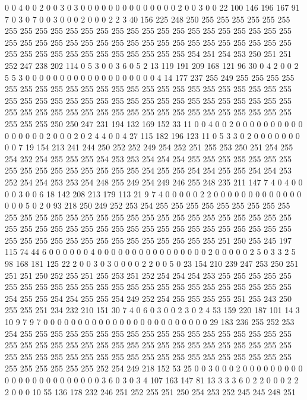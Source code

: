 0 0 4 0 0 2 0 0 3 0 3 0 0 0 0 0 0 0 0 0
0 0 0 0 0 2 0 0 3 0 0 22 100 146 196 167 91 7 0 3
0 7 0 0 3 0 0 0 2 0 0 0 2 2 3 40 156 225 248 250
255 255 255 255 255 255 255 255 255 255 255 255 255 255 255 255 255 255 255 255
255 255 255 255 255 255 255 255 255 255 255 255 255 255 255 255 255 255 255 255
255 255 255 255 255 255 255 255 255 255 255 255 255 255 255 255 254 251 254 253
250 251 251 252 247 238 202 114 0 5 3 0 0 3 6 0 5 2 13 119
191 209 168 121 96 30 0 4 2 0 0 2 5 5 3 0 0 0 0 0
0 0 0 0 0 0 0 0 0 0 0 0 0 0 4 14 177 237 255 249
255 255 255 255 255 255 255 255 255 255 255 255 255 255 255 255 255 255 255 255
255 255 255 255 255 255 255 255 255 255 255 255 255 255 255 255 255 255 255 255
255 255 255 255 255 255 255 255 255 255 255 255 255 255 255 255 255 255 255 255
255 255 255 255 250 250 247 231 194 132 169 152 33 11 0 0 4 0 0 2
0 0 0 0 0 0 0 0 0 0 0 0 0 0 0 0 2 0 0 0
2 0 2 4 4 0 0 4 27 115 182 196 123 11 0 5 3 3 0 2
0 0 0 0 0 0 0 0 0 7 19 154 213 241 244 250 252 252 249 254
252 251 255 253 250 251 254 255 254 252 254 255 255 255 254 253 253 254 254 254
255 255 255 255 255 255 255 255 255 255 255 255 255 255 255 255 254 255 255 254
254 255 255 254 254 253 252 254 254 253 253 254 248 255 249 254 249 246 255 248
235 211 147 7 4 0 4 0 0 0 0 3 0 0 6 18 142 208 213 179
113 21 9 7 4 0 0 0 0 0 2 2 0 0 0 0 0 0 0 0
0 0 0 0 0 0 0 0 5 0 2 0 93 218 250 249 252 253 254 255
255 255 255 255 255 255 255 255 255 255 255 255 255 255 255 255 255 255 255 255
255 255 255 255 255 255 255 255 255 255 255 255 255 255 255 255 255 255 255 255
255 255 255 255 255 255 255 255 255 255 255 255 255 255 255 255 255 255 255 255
251 250 255 245 197 115 74 44 6 0 0 0 0 0 0 4 0 0 0 0
0 0 0 0 0 0 0 0 0 0 0 0 2 0 0 0 0 0 2 5
0 3 3 2 5 98 168 181 125 22 2 0 0 3 0 3 0 0 0 0
2 2 0 0 5 0 23 154 210 239 247 253 250 251 251 251 250 252 255 251
255 253 251 252 254 254 254 253 255 255 255 255 255 255 255 255 255 255 255 255
255 255 255 255 255 255 255 255 255 255 255 255 254 255 255 254 254 255 255 254
249 252 254 255 255 255 255 251 255 243 250 255 255 251 234 232 210 151 30 7
4 0 6 0 3 0 0 2 3 0 2 4 53 159 220 187 101 14 3 10
9 7 9 7 0 0 0 0 0 0 0 0 0 0 0 0 0 0 0 0
0 0 0 0 0 0 0 0 29 183 236 255 252 253 254 255 255 255 255 255
255 255 255 255 255 255 255 255 255 255 255 255 255 255 255 255 255 255 255 255
255 255 255 255 255 255 255 255 255 255 255 255 255 255 255 255 255 255 255 255
255 255 255 255 255 255 255 255 255 255 255 255 255 255 255 255 255 252 254 249
218 152 53 25 0 0 3 0 0 0 2 0 0 0 0 0 0 0 0 0
0 0 0 0 0 0 0 0 0 0 0 0 0 0 3 6 0 3 0 3
4 107 163 147 81 13 3 3 3 6 0 2 2 0 0 0 2 2 2 0
0 0 10 55 136 178 232 246 251 252 255 251 250 254 253 252 245 245 248 251
